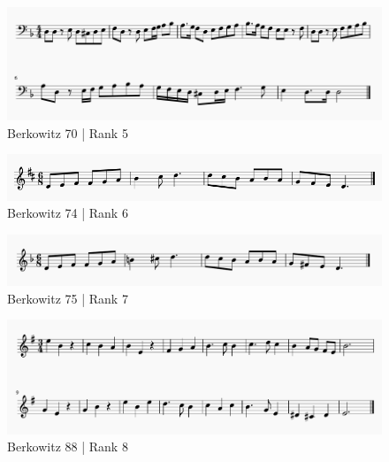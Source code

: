 \documentclass[]{book}
\begin{document}
\begin{figure}

{\centering \includegraphics[width=1\linewidth]{img/survey_melodies/Berkowitz70} 

}

\caption{Berkowitz 70 | Rank 5}\label{fig:berk70}
\end{figure}

\begin{figure}

{\centering \includegraphics[width=1\linewidth]{img/survey_melodies/Berkowitz74} 

}

\caption{Berkowitz 74 | Rank 6}\label{fig:berk74}
\end{figure}

\begin{figure}

{\centering \includegraphics[width=1\linewidth]{img/survey_melodies/Berkowitz75} 

}

\caption{Berkowitz 75 | Rank 7}\label{fig:berk75}
\end{figure}

\begin{figure}

{\centering \includegraphics[width=1\linewidth]{img/survey_melodies/Berkowitz88} 

}

\caption{Berkowitz 88 | Rank 8}\label{fig:berk88}
\end{figure}
\end{document}
